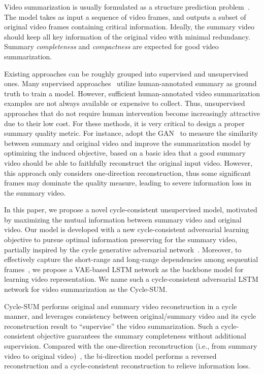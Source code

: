 \documentclass[letterpaper]{article} \usepackage{aaai19}  \usepackage{times}  \usepackage{helvet}  \usepackage{courier}  \usepackage{url}  \usepackage{graphicx}  \frenchspacing  \setlength{\pdfpagewidth}{8.5in}  \setlength{\pdfpageheight}{11in}  \usepackage{amsmath}
\begin{document}
Video summarization is usually formulated as a structure prediction problem~\cite{zhang2016video,mahasseni2017unsupervised}. The model takes as input a sequence of video frames, and outputs a subset of original video frames containing critical information. Ideally, the summary video should keep all key information of the original video with minimal redundancy. Summary \emph{completeness} and \emph{compactness} are expected for good video summarization.

Existing approaches can be roughly grouped into supervised and unsupervised ones. Many supervised approaches~\cite{zhang2016video,gygli2015video} utilize human-annotated summary as ground truth to train a model. However, sufficient human-annotated video summarization examples are not always available or expensive to collect. Thus, unsupervised approaches that do not require human intervention become increasingly attractive due to their low cost. For these methods, it is very critical to design a proper summary quality metric. For instance, \cite{mahasseni2017unsupervised} adopt the GAN~\cite{goodfellow2014generative} to measure the similarity between summary and original video and improve the summarization model by optimizing the induced objective, based on a basic idea that a good summary video should be able to faithfully reconstruct the original input video. However, this approach only considers one-direction reconstruction, thus some significant frames may dominate the quality measure, leading to severe information loss in the summary video.

In this paper, we propose a novel cycle-consistent unsupervised model, motivated by maximizing the mutual information between summary video and original video. Our model is developed with a new cycle-consistent adversarial learning objective to pursue optimal information preserving for the summary video, partially inspired by the cycle generative adversarial network~\cite{zhu2017unpaired,yi2017dualgan}. Moreover, to effectively capture the short-range and long-range dependencies among sequential frames~\cite{zhang2016video}, we propose a VAE-based LSTM network as the backbone model for learning video representation.
We name such a cycle-consistent adversarial LSTM network for video summarization as the Cycle-SUM.

Cycle-SUM performs  original and summary video reconstruction in a cycle manner, and leverages consistency between original/summary video and its cycle reconstruction result  to ``supervise'' the video summarization.
Such a cycle-consistent objective guarantees the summary completeness without additional supervision. Compared with the one-direction reconstruction (i.e., from summary video to original video)~\cite{zhu2017unpaired,yi2017dualgan}, the bi-direction model performs a reversed reconstruction and a cycle-consistent reconstruction to relieve information loss.
\end{document}
